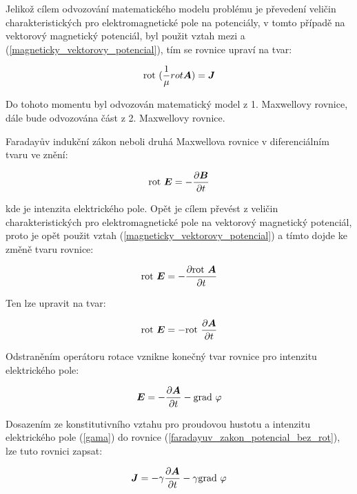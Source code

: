Jelikož cílem odvozování matematického modelu problému je převedení veličin charakteristických pro elektromagnetické pole na potenciály, v tomto případě na vektorový magnetický potenciál, byl použit vztah mezi  a (\ref{magneticky_vektorovy_potencial}), tím se rovnice upraví na tvar:

\begin{equation}
 	\mathrm{rot}\  (\frac{1}{\mu} {rot \mbox{\boldmath$A$}}) = \mbox{\boldmath$J$}
 	\label{prvni_max_odvoz}
\end{equation}

Do tohoto momentu byl odvozován matematický model z 1. Maxwellovy rovnice, dále bude odvozována část z 2. Maxwellovy rovnice.
	
	Faradayův indukční zákon neboli druhá Maxwellova rovnice v diferenciálním tvaru ve znění:

\begin{equation}
	\mathrm{rot}\  \mbox{\boldmath$E$} = - \frac{\partial \mbox{\boldmath$B$}}{\partial t}
	\label{faradayuv_zakon}
\end{equation}

kde  je intenzita elektrického pole. Opět je cílem převést z veličin charakteristických pro elektromagnetické pole na vektorový magnetický potenciál, proto je opět použit vztah (\ref{magneticky_vektorovy_potencial}) a tímto dojde ke změně tvaru rovnice:

\begin{equation}
	\mathrm{rot}\  \mbox{\boldmath$E$} = - \frac{\partial\mathrm{rot}\ \mbox{\boldmath$A$}}{\partial t}
	\label{faradayuv_zakon_potencial}
\end{equation}

Ten lze upravit na tvar:

\begin{equation}
	\mathrm{rot}\  \mbox{\boldmath$E$} = - \mathrm{rot}\  \frac{\partial\mbox{\boldmath$A$}}{\partial t}
	\label{faradayuv_zakon_potencial_rot}
\end{equation}

Odstraněním operátoru rotace vznikne konečný tvar rovnice pro intenzitu elektrického pole:

\begin{equation}
	\mbox{\boldmath$E$} = - \frac{\partial \mbox{\boldmath$A$}}{\partial t} - \mathrm{grad}\ {\varphi}
	\label{faradayuv_zakon_potencial_bez_rot}
\end{equation}

Dosazením ze konstitutivního vztahu pro proudovou hustotu  a intenzitu elektrického pole  (\ref{gama}) do rovnice (\ref{faradayuv_zakon_potencial_bez_rot}), lze tuto rovnici zapsat:

\begin{equation}
	\mbox{\boldmath$J$} = - \gamma \frac{\partial \mbox{\boldmath$A$}}{\partial t} - \gamma \mathrm{grad}\ {\varphi}
	\label{faradayuv_zakon_potencial_konstitutivni}
\end{equation}

